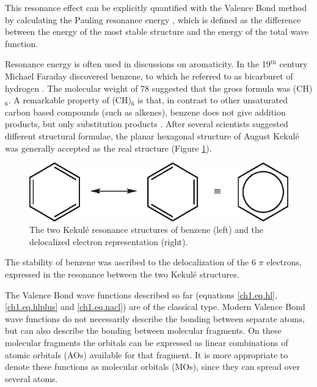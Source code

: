 This resonance effect can be explicitly quantified with the Valence Bond method by calculating the Pauling resonance energy \cite{paulingbook}, which is defined as the difference between the energy of the most stable structure and the energy of the total wave function. 

Resonance energy is often used in discussions on aromaticity. In the 19$^\mathrm{th}$ century Michael Faraday discovered benzene, to which he referred to as bicarburet of hydrogen \cite{faraday,bicarburet}. The molecular weight of 78 suggested that the gross formula was (CH)$_6$. A remarkable property of (CH)$_6$ is that, in contrast to other unsaturated carbon based compounds (such as alkenes), benzene does not give addition products, but only substitution products \cite{bruice}. After several scientists suggested different structural formulae, the planar hexagonal structure of August Kekul\'e \cite{kekule} was generally accepted as the real structure (Figure \ref{ch1.fig.benzene}). 
\begin{figure}[htp]
\center
\includegraphics{introduction/figures/benzene.eps}
\caption{The two Kekul\'e resonance structures of benzene (left) and the delocalized electron representation (right).}
\label{ch1.fig.benzene}
\end{figure}
The stability of benzene was ascribed to the delocalization of the 6 $\pi$ electrons, expressed in the resonance between the two Kekul\'e structures.

The Valence Bond wave functions described so far (equations \ref{ch1.eq.hl}, \ref{ch1.eq.hlplus} and \ref{ch1.eq.nacl}) are of the classical type. Modern Valence Bond wave functions do not necessarily describe the bonding between separate atoms, but can also describe the bonding between molecular fragments. On these molecular fragments the orbitals can be expressed as linear combinations of atomic orbitals (AOs) available for that fragment. It is more appropriate to denote these functions as molecular orbitals (MOs), since they can spread over several atoms. 

